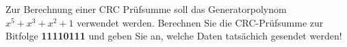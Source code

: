 
Zur Berechnung einer CRC Prüfsumme soll das Generatorpolynom $x^5 + x^3 + x^2 + 1$ verwendet werden.
Berechnen Sie die CRC-Prüfsumme zur Bitfolge \textbf{11110111} und geben Sie an, welche Daten tatsächich gesendet werden!